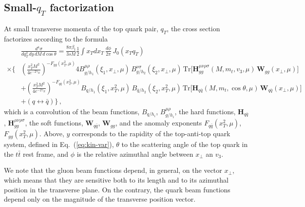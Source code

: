 \documentclass[a4paper,11pt]{article}
\newcommand{\ttbar}{\ensuremath{t \bar t}\xspace}
\numberwithin{equation}{section}
\begin{document}
\subsection{Small-$q_T$ factorization}

At small transverse momenta of the top quark pair, $q_T$, the cross section
factorizes according to the formula~\cite{Li:2013mia}
%
\begin{align}
  &\frac{d^4\sigma}{dq_T^2 \, dy \, dM \, d\cos\theta} = \frac{8\pi\beta_t}{3s
M} \frac{1}{2} \int x_Tdx_T \, \frac{d\phi}{2\pi} \, J_0(x_Tq_T) \, 
  \nonumber
  \\
  \times
  \bigg\{ 
  &\left( \frac{x_T^2M^2}{4e^{-2\gamma_E}} \right)^{-F_{gg}(x_T^2,\mu)} 4
B^{\mu\rho}_{g/h_1}(\xi_1,x_\perp,\mu) \,
B^{\nu\sigma}_{g/h_2}(\xi_2,x_\perp,\mu) \, \mathrm{Tr} \big[
\bm{H}^{\mu\nu\rho\sigma}_{gg}(M,m_t,v_3,\mu) \, \bm{W}_{gg}(x_\perp,\mu) \big]
  \nonumber
  \\
  &+ \left( \frac{x_T^2M^2}{4e^{-2\gamma_E}} \right)^{-F_{q\bar{q}}(x_T^2,\mu)}
B_{q/h_1}(\xi_1,x_T^2,\mu) \, B_{\bar{q}/h_2}(\xi_2,x_T^2,\mu) \, \mathrm{Tr}
\big[ \bm{H}_{q\bar{q}}(M,m_t,\cos\theta,\mu) \, \bm{W}_{q\bar{q}}(x_\perp,\mu)
\big] \nonumber
  \\
  &+ (q \leftrightarrow \bar{q}) \bigg\} \,,
  \label{eq:factorization-scet}
\end{align}
%
which is a convolution of the beam functions, $B_{q/h_i}$,
$B^{\mu\rho}_{g/h_i}$, the hard functions, 
$\bm{H}_{q\bar{q}}$, 
$\bm{H}^{\mu\nu\rho\sigma}_{gg}$,
the soft functions, 
$\bm{W}_{q\bar{q}}$, $\bm{W}_{gg}$, and the anomaly exponents 
$F_{q\bar{q}}(x_T^2,\mu)$, $F_{gg}(x_T^2,\mu)$.
%
Above, $y$ corresponds to the rapidity of the top-anti-top quark system, defined
in Eq.~(\ref{eq:kin-var}), $\theta$ to the scattering angle of the top quark in
the \ttbar rest frame, and $\phi$ is the relative azimuthal angle between
$x_\perp$ an $v_3$.
 
We note that the gluon beam functions depend, in general, on the vector
$x_\perp$, which means that they are sensitive both to its length and to its
azimuthal position in the transverse plane. On the contrary, the quark beam
functions depend only on the magnitude of the transverse position vector.
\end{document}
